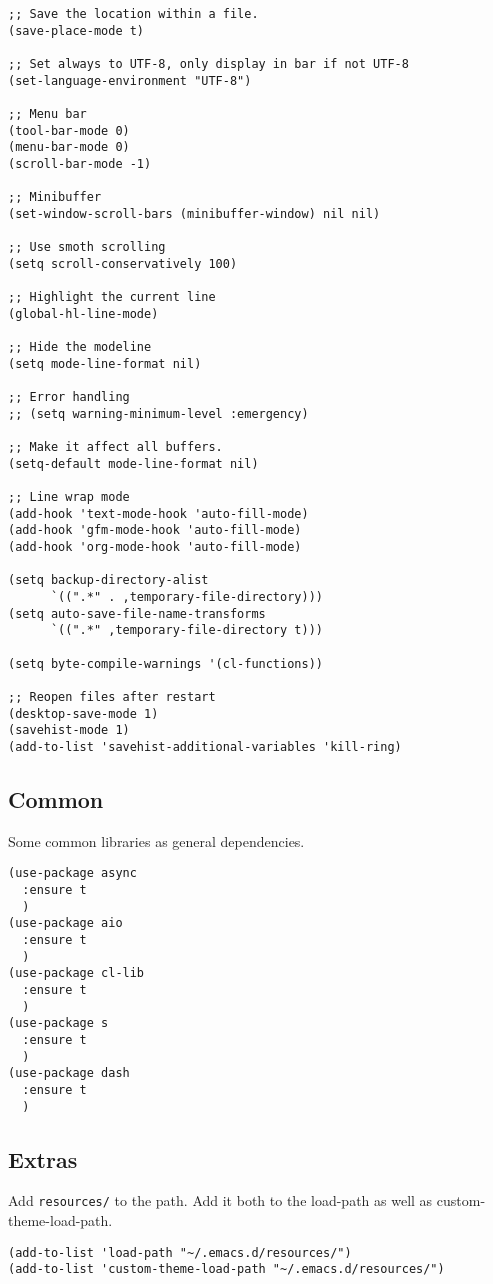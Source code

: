 \documentclass[11pt]{article}
\begin{document}
\begin{verbatim}
;; Save the location within a file.
(save-place-mode t)

;; Set always to UTF-8, only display in bar if not UTF-8
(set-language-environment "UTF-8")

;; Menu bar
(tool-bar-mode 0)
(menu-bar-mode 0)
(scroll-bar-mode -1)

;; Minibuffer
(set-window-scroll-bars (minibuffer-window) nil nil)

;; Use smoth scrolling
(setq scroll-conservatively 100)

;; Highlight the current line
(global-hl-line-mode)

;; Hide the modeline
(setq mode-line-format nil)

;; Error handling
;; (setq warning-minimum-level :emergency)

;; Make it affect all buffers.
(setq-default mode-line-format nil)

;; Line wrap mode
(add-hook 'text-mode-hook 'auto-fill-mode)
(add-hook 'gfm-mode-hook 'auto-fill-mode)
(add-hook 'org-mode-hook 'auto-fill-mode)

(setq backup-directory-alist
      `((".*" . ,temporary-file-directory)))
(setq auto-save-file-name-transforms
      `((".*" ,temporary-file-directory t)))

(setq byte-compile-warnings '(cl-functions))

;; Reopen files after restart
(desktop-save-mode 1)
(savehist-mode 1)
(add-to-list 'savehist-additional-variables 'kill-ring)
\end{verbatim}
\subsection{Common}
\label{sec:org4bc491c}
Some common libraries as general dependencies. 
\begin{verbatim}
(use-package async
  :ensure t
  )
(use-package aio
  :ensure t
  )
(use-package cl-lib
  :ensure t
  )
(use-package s
  :ensure t
  )
(use-package dash
  :ensure t
  )
\end{verbatim}
\subsection{Extras}
\label{sec:orgf6a551e}
Add \texttt{resources/} to the path. Add it both to the load-path as well as
custom-theme-load-path.
\begin{verbatim}
(add-to-list 'load-path "~/.emacs.d/resources/")
(add-to-list 'custom-theme-load-path "~/.emacs.d/resources/")
\end{verbatim}
\end{document}
